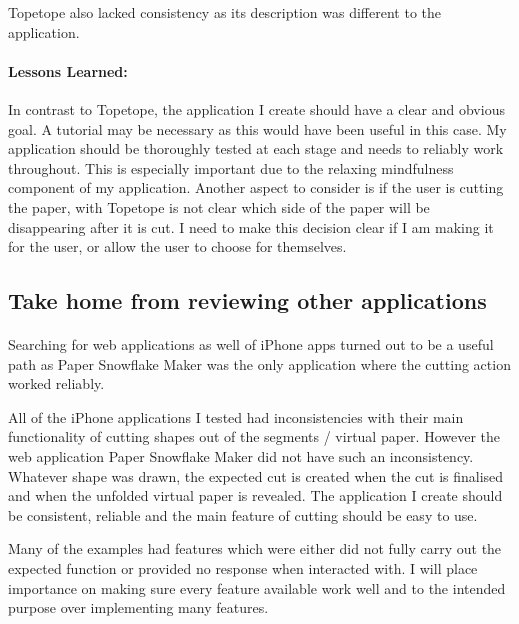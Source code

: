 \documentclass[11pt]{article}
\begin{document}
                 Topetope also lacked consistency as its description was different to the application.

                \paragraph{Lessons Learned:}
                In contrast to Topetope, the application I create should have a clear and obvious goal. A tutorial may be necessary as this would have been useful in this case. My application should be thoroughly tested at each stage and needs to reliably work throughout. This is especially important due to the relaxing mindfulness component of my application. Another aspect to consider is if the user is cutting the paper, with Topetope is not clear which side of the paper will be disappearing after it is cut. I need to make this decision clear if I am making it for the user, or allow the user to choose for themselves. 


       \subsection{Take home from reviewing other applications}
       
            \paragraph{}
            Searching for web applications as well of iPhone apps turned out to be a useful path as Paper Snowflake Maker was the only application where the cutting action worked reliably.
            
            All of the iPhone applications I tested had inconsistencies with their main functionality of cutting shapes out of the segments / virtual paper. However the web application Paper Snowflake Maker did not have such an inconsistency. Whatever shape was drawn, the expected cut is created when the cut is finalised and when the unfolded virtual paper is revealed. The application I create should be consistent, reliable and the main feature of cutting should be easy to use.  
            
            Many of the examples had features which were either did not fully carry out the expected function or provided no response when interacted with. I will place importance on making sure every feature available work well and to the intended purpose over implementing many features. 
            
\end{document}
